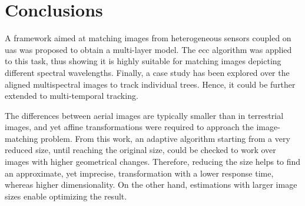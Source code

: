 \section{Conclusions}

A framework aimed at matching images from heterogeneous sensors coupled on \acrshort{uas} was proposed to obtain a multi-layer model. The \acrshort{ecc} algorithm was applied to this task, thus showing it is highly suitable for matching images depicting different spectral wavelengths. Finally, a case study has been explored over the aligned multispectral images to track individual trees. Hence, it could be further extended to multi-temporal tracking.

The differences between aerial images are typically smaller than in terrestrial images, and yet affine transformations were required to approach the image-matching problem. From this work, an adaptive algorithm starting from a very reduced size, until reaching the original size, could be checked to work over images with higher geometrical changes. Therefore, reducing the size helps to find an approximate, yet imprecise, transformation with a lower response time, whereas higher dimensionality. On the other hand, estimations with larger image sizes enable optimizing the result. 

